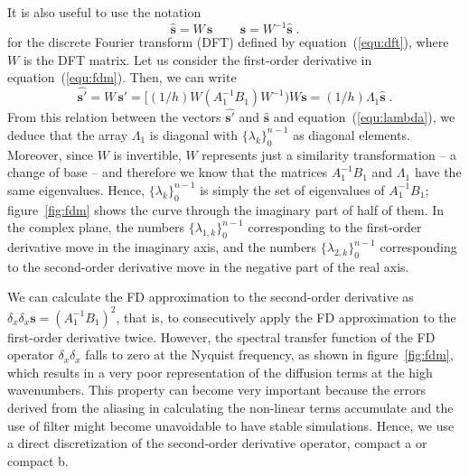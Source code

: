 It is also useful to use the notation
\begin{equation}
  \hat{\mathbf{s}} = W\, \mathbf{s}\,\qquad \mathbf{s}=W^{-1}\hat{\mathbf{s}}\;.
\end{equation}
for the discrete Fourier transform (DFT) defined by equation~(\ref{equ:dft}),
where $W$ is the DFT matrix. Let us consider the first-order derivative in
equation~(\ref{equ:fdm}). Then, we can write
\begin{equation}
  \hat{\mathbf{s'}}=W\, \mathbf{s'} =
  [(1/h)W(A_1^{-1}B_1)W^{-1})W\mathbf{s} = (1/h)\Lambda_1\hat{\mathbf{s}} \;.
\end{equation}
From this relation between the vectors $\hat{\mathbf{s'}}$ and $\hat{\mathbf{s}}$ and equation~(\ref{equ:lambda}), we deduce that the array $\Lambda_1$ is diagonal with $\{\lambda_k\}_0^{n-1}$ as diagonal elements. Moreover, since $W$ is invertible, $W$ represents just a similarity transformation -- a change of base -- and therefore we know that the matrices $A_1^{-1}B_1$ and $\Lambda_1$ have the same eigenvalues. Hence, $\{\lambda_k\}_0^{n-1}$ is simply the set of eigenvalues of $A_1^{-1}B_1$; figure~\ref{fig:fdm} shows the curve through the imaginary part of half of them. In the complex plane, the numbers $\{\lambda_{1,k}\}_0^{n-1}$ corresponding to the first-order derivative move in the imaginary axis, and the numbers $\{\lambda_{2,k}\}_0^{n-1}$ corresponding to the second-order derivative move in the negative part of the real axis.

We can calculate the FD approximation to the second-order derivative as $\delta_{x}\delta_{x} \mathbf{s} = (A_1^{-1}B_1)^2$, that is, to consecutively apply the FD approximation to the first-order derivative twice. However, the spectral transfer function of the FD operator $\delta_{x}\delta_{x}$ falls to zero at the Nyquist frequency, as shown in figure~\ref{fig:fdm}, which results in a very poor representation of the diffusion terms at the high wavenumbers. This property can become very important because the errors derived from the aliasing in calculating the non-linear terms accumulate and the use of filter might become unavoidable to have stable simulations. Hence, we use a direct discretization of the second-order derivative operator, compact a or compact b.

